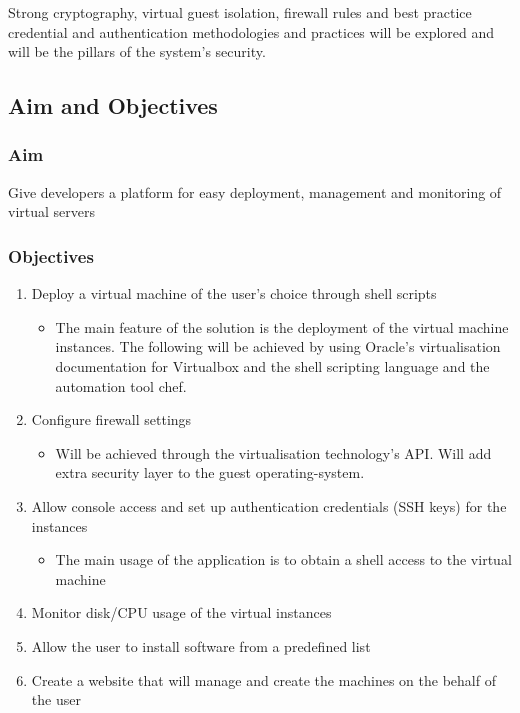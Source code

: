 \documentclass{article}
\begin{document}
Strong cryptography, virtual guest isolation, firewall rules and best practice credential and authentication methodologies and practices will be explored and will be the pillars of the system's security.
\subsection{Aim and Objectives}
\subsubsection{Aim}
Give developers a platform for easy deployment, management and monitoring of virtual servers
\subsubsection{Objectives}

\begin{enumerate}
	\item Deploy a virtual machine of the user's choice through shell scripts
	      \begin{itemize}
		      \item The main feature of the solution is the deployment of the virtual machine instances. The following will be achieved by using Oracle's virtualisation documentation for Virtualbox and the shell scripting language and the automation tool chef.
	      \end{itemize}

	\item Configure firewall settings
	      \begin{itemize}
		      \item Will be achieved through the virtualisation technology's API. Will add extra security layer to the guest \gls{operating-system}.
	      \end{itemize}

	\item Allow console access and set up authentication credentials (SSH keys) for the instances
	      \begin{itemize}
		      \item The main usage of the application is to obtain a shell access to the virtual machine
	      \end{itemize}
	\item Monitor disk/CPU usage of the virtual instances
	\item Allow the user to install software from a predefined list
	\item Create a website that will manage and create the machines on the behalf of the user
\end{enumerate}
\end{document}
